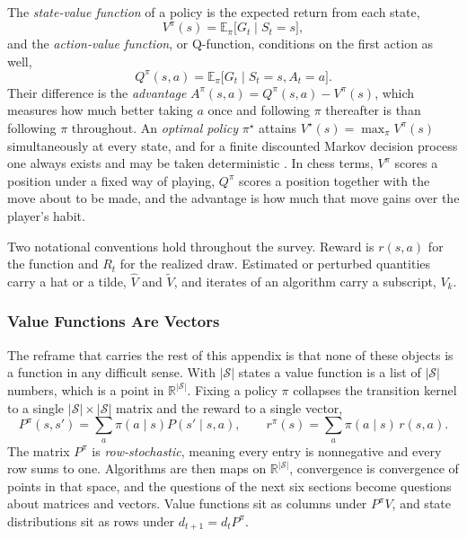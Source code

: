 The \emph{state-value function} of a policy is the expected return from each state,
\begin{equation}
V^\pi(s) = \mathbb{E}_\pi\bigl[G_t \mid S_t = s\bigr],
\label{eq:prelim_vpi}
\end{equation}
and the \emph{action-value function}, or Q-function, conditions on the first action as well,
\begin{equation}
Q^\pi(s,a) = \mathbb{E}_\pi\bigl[G_t \mid S_t = s, A_t = a\bigr].
\label{eq:prelim_qpi}
\end{equation}
Their difference is the \emph{advantage} $A^\pi(s,a) = Q^\pi(s,a) - V^\pi(s)$, which measures how much better taking $a$ once and following $\pi$ thereafter is than following $\pi$ throughout. An \emph{optimal policy} $\pi^\star$ attains $V^\star(s) = \max_\pi V^\pi(s)$ simultaneously at every state, and for a finite discounted Markov decision process one always exists and may be taken deterministic \citep{puterman1994}. In chess terms, $V^\pi$ scores a position under a fixed way of playing, $Q^\pi$ scores a position together with the move about to be made, and the advantage is how much that move gains over the player's habit.

Two notational conventions hold throughout the survey. Reward is $r(s,a)$ for the function and $R_t$ for the realized draw. Estimated or perturbed quantities carry a hat or a tilde, $\widehat{V}$ and $\widetilde{V}$, and iterates of an algorithm carry a subscript, $V_k$.

\subsubsection{Value Functions Are Vectors}

The reframe that carries the rest of this appendix is that none of these objects is a function in any difficult sense. With $|\mathcal{S}|$ states a value function is a list of $|\mathcal{S}|$ numbers, which is a point in $\mathbb{R}^{|\mathcal{S}|}$. Fixing a policy $\pi$ collapses the transition kernel to a single $|\mathcal{S}| \times |\mathcal{S}|$ matrix and the reward to a single vector,
\begin{equation}
P^\pi(s, s') = \sum_a \pi(a \mid s) P(s' \mid s, a),
\qquad
r^\pi(s) = \sum_a \pi(a \mid s)\, r(s,a).
\label{eq:prelim_ppi}
\end{equation}
The matrix $P^\pi$ is \emph{row-stochastic}, meaning every entry is nonnegative and every row sums to one. Algorithms are then maps on $\mathbb{R}^{|\mathcal{S}|}$, convergence is convergence of points in that space, and the questions of the next six sections become questions about matrices and vectors. Value functions sit as columns under $P^\pi V$, and state distributions sit as rows under $d_{t+1} = d_t P^\pi$.

